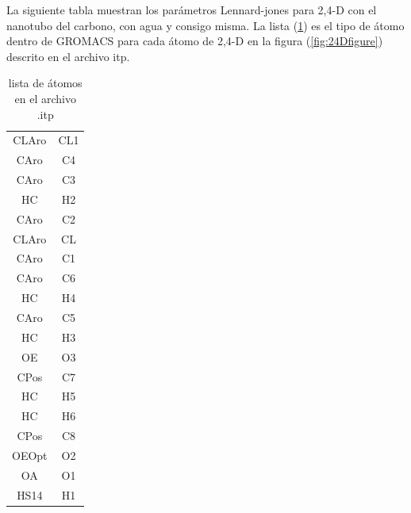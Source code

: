 



La siguiente tabla muestran los parámetros Lennard-jones para 2,4-D con el nanotubo del carbono, con agua y consigo misma. La lista (\ref{tab:24Ditp}) es el tipo de átomo dentro de GROMACS para cada átomo de 2,4-D en la figura (\ref{fig:24Dfigure}) descrito en el archivo itp.

\begin{table}[!h]
    \centering
    \begin{tabular}{|c|c|}
    \hline
   CLAro & CL1\\
    CAro &  C4\\
    CAro &  C3\\
      HC &  H2\\
    CAro &  C2\\
   CLAro &  CL\\
    CAro &  C1\\
    CAro &  C6\\
      HC &  H4\\
    CAro &  C5\\
      HC &  H3\\
      OE &  O3\\
    CPos &  C7\\
      HC &  H5\\
      HC &  H6\\
    CPos &  C8\\
   OEOpt &  O2\\
      OA &  O1\\
    HS14 &  H1\\
    \hline
    \end{tabular}
    \caption{lista de átomos en el archivo .itp}
    \label{tab:24Ditp}
\end{table}


